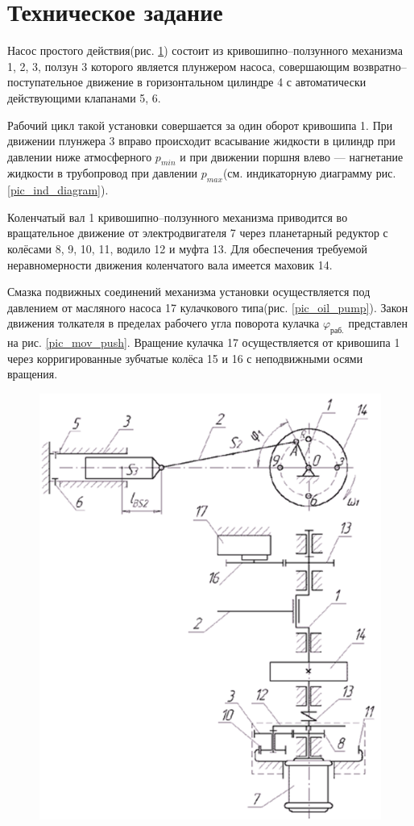 \section*{Техническое задание}
Насос простого действия(рис. \ref{pic_pump}) состоит из кривошипно--ползунного механизма 1, 2, 3, ползун 3 которого является плунжером насоса, совершающим возвратно--поступательное движение в горизонтальном цилиндре 4 с автоматически действующими клапанами 5, 6.

Рабочий цикл такой установки совершается за один оборот кривошипа 1. При движении плунжера 3 вправо происходит всасывание жидкости в цилиндр при давлении ниже атмосферного $p_{min}$ и при движении поршня влево --- нагнетание жидкости в трубопровод при давлении $p_{max}$(см. индикаторную диаграмму рис. \ref{pic_ind_diagram}).

Коленчатый вал 1 кривошипно--ползунного механизма приводится во вращательное движение от электродвигателя 7 через планетарный редуктор с колёсами 8, 9, 10, 11, водило 12 и муфта 13. Для обеспечения требуемой неравномерности движения коленчатого вала имеется маховик 14.

Смазка подвижных соединений механизма установки осуществляется под давлением от масляного насоса 17 кулачкового типа(рис. \ref{pic_oil_pump}). Закон движения толкателя в пределах рабочего угла поворота кулачка $\varphi_{раб.}$ представлен на рис. \ref{pic_mov_push}. Вращение кулачка 17 осуществляется от кривошипа 1 через корригированные зубчатые колёса 15 и 16 с неподвижными осями вращения.

\begin{figure}[h!]
	\centering
	\includegraphics[width=0.5\linewidth]{pic/Source_mech}
	\caption{}
	\label{pic_pump}
\end{figure}

